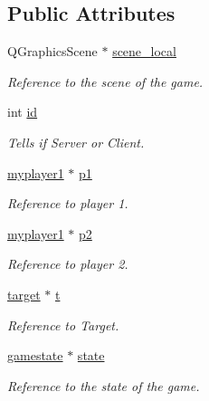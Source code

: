 \subsection*{Public Attributes}
\begin{DoxyCompactItemize}
\item 
\mbox{\label{classscreen_update_a3ed9e1106e743e1d7916c6107237a6c6}} 
Q\+Graphics\+Scene $\ast$ \hyperlink{classscreen_update_a3ed9e1106e743e1d7916c6107237a6c6}{scene\+\_\+local}
\begin{DoxyCompactList}\small\item\em Reference to the scene of the game. \end{DoxyCompactList}\item 
\mbox{\label{classscreen_update_a1022348c9f7f684ca3c8dc6bcb53c4b2}} 
int \hyperlink{classscreen_update_a1022348c9f7f684ca3c8dc6bcb53c4b2}{id}
\begin{DoxyCompactList}\small\item\em Tells if Server or Client. \end{DoxyCompactList}\item 
\mbox{\label{classscreen_update_a8177d584c17e9018da226571c6789724}} 
\hyperlink{classmyplayer1}{myplayer1} $\ast$ \hyperlink{classscreen_update_a8177d584c17e9018da226571c6789724}{p1}
\begin{DoxyCompactList}\small\item\em Reference to player 1. \end{DoxyCompactList}\item 
\mbox{\label{classscreen_update_a7b1fa00ae6daac23742776f647df7d52}} 
\hyperlink{classmyplayer1}{myplayer1} $\ast$ \hyperlink{classscreen_update_a7b1fa00ae6daac23742776f647df7d52}{p2}
\begin{DoxyCompactList}\small\item\em Reference to player 2. \end{DoxyCompactList}\item 
\mbox{\label{classscreen_update_a60461a2c1374a3de8c3690b4a9407515}} 
\hyperlink{classtarget}{target} $\ast$ \hyperlink{classscreen_update_a60461a2c1374a3de8c3690b4a9407515}{t}
\begin{DoxyCompactList}\small\item\em Reference to Target. \end{DoxyCompactList}\item 
\mbox{\label{classscreen_update_ac93039dd4a91aa32acbcc656695a3185}} 
\hyperlink{classgamestate}{gamestate} $\ast$ \hyperlink{classscreen_update_ac93039dd4a91aa32acbcc656695a3185}{state}
\begin{DoxyCompactList}\small\item\em Reference to the state of the game. \end{DoxyCompactList}\end{DoxyCompactItemize}


